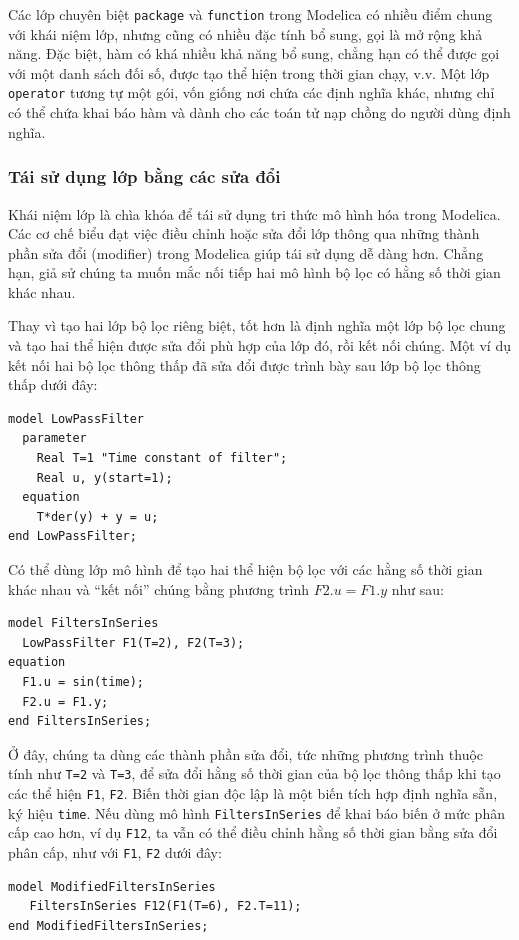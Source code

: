Các lớp chuyên biệt \texttt{package} và \texttt{function} trong Modelica có nhiều điểm chung với khái niệm lớp, nhưng cũng có nhiều đặc tính bổ sung, gọi là mở rộng khả năng. Đặc biệt, hàm có khá nhiều khả năng bổ sung, chẳng hạn có thể được gọi với một danh sách đối số, được tạo thể hiện trong thời gian chạy, v.v. Một lớp \texttt{operator} tương tự một gói, vốn giống nơi chứa các định nghĩa khác, nhưng chỉ có thể chứa khai báo hàm và dành cho các toán tử nạp chồng do người dùng định nghĩa.

\subsubsection{Tái sử dụng lớp bằng các sửa đổi}
Khái niệm lớp là chìa khóa để tái sử dụng tri thức mô hình hóa trong Modelica. Các cơ chế biểu đạt việc điều chỉnh hoặc sửa đổi lớp thông qua những thành phần sửa đổi (modifier) trong Modelica giúp tái sử dụng dễ dàng hơn. Chẳng hạn, giả sử chúng ta muốn mắc nối tiếp hai mô hình bộ lọc có hằng số thời gian khác nhau.

Thay vì tạo hai lớp bộ lọc riêng biệt, tốt hơn là định nghĩa một lớp bộ lọc chung và tạo hai thể hiện được sửa đổi phù hợp của lớp đó, rồi kết nối chúng. Một ví dụ kết nối hai bộ lọc thông thấp đã sửa đổi được trình bày sau lớp bộ lọc thông thấp dưới đây:
\begin{verbatim}
model LowPassFilter
  parameter
    Real T=1 "Time constant of filter";
    Real u, y(start=1);
  equation
    T*der(y) + y = u;
end LowPassFilter;
\end{verbatim}
Có thể dùng lớp mô hình để tạo hai thể hiện bộ lọc với các hằng số thời gian khác nhau và ``kết nối'' chúng bằng phương trình $F2.u=F1.y$ như sau:
\begin{verbatim}
model FiltersInSeries
  LowPassFilter F1(T=2), F2(T=3);
equation
  F1.u = sin(time);
  F2.u = F1.y;
end FiltersInSeries;
\end{verbatim}
Ở đây, chúng ta dùng các thành phần sửa đổi, tức những phương trình thuộc tính như \texttt{T=2} và \texttt{T=3}, để sửa đổi hằng số thời gian của bộ lọc thông thấp khi tạo các thể hiện \texttt{F1}, \texttt{F2}. Biến thời gian độc lập là một biến tích hợp định nghĩa sẵn, ký hiệu \texttt{time}. Nếu dùng mô hình \texttt{FiltersInSeries} để khai báo biến ở mức phân cấp cao hơn, ví dụ \texttt{F12}, ta vẫn có thể điều chỉnh hằng số thời gian bằng sửa đổi phân cấp, như với \texttt{F1}, \texttt{F2} dưới đây:
\begin{verbatim}
model ModifiedFiltersInSeries
   FiltersInSeries F12(F1(T=6), F2.T=11);
end ModifiedFiltersInSeries;
\end{verbatim}

